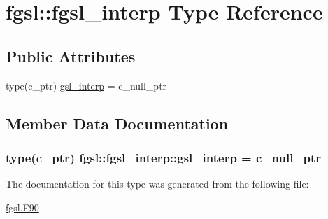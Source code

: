\hypertarget{structfgsl_1_1fgsl__interp}{\section{fgsl\-:\-:fgsl\-\_\-interp Type Reference}
\label{structfgsl_1_1fgsl__interp}
}
\subsection*{Public Attributes}
\begin{DoxyCompactItemize}
\item 
type(c\-\_\-ptr) \hyperlink{structfgsl_1_1fgsl__interp_a7f2707585c89f00e8c9964634ecf9d40}{gsl\-\_\-interp} = c\-\_\-null\-\_\-ptr
\end{DoxyCompactItemize}


\subsection{Member Data Documentation}
\hypertarget{structfgsl_1_1fgsl__interp_a7f2707585c89f00e8c9964634ecf9d40}{
\subsubsection[{gsl\-\_\-interp}]{\setlength{\rightskip}{0pt plus 5cm}type(c\-\_\-ptr) fgsl\-::fgsl\-\_\-interp\-::gsl\-\_\-interp = c\-\_\-null\-\_\-ptr}}\label{structfgsl_1_1fgsl__interp_a7f2707585c89f00e8c9964634ecf9d40}


The documentation for this type was generated from the following file\-:\begin{DoxyCompactItemize}
\item 
\hyperlink{fgsl_8F90}{fgsl.\-F90}\end{DoxyCompactItemize}
